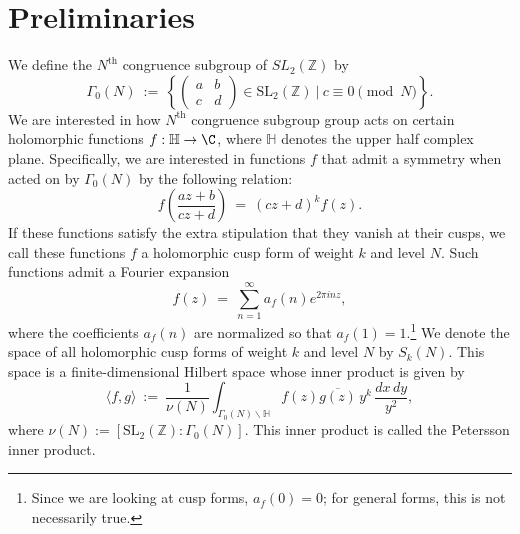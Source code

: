 \documentclass[11pt, reqno]{amsart}
\theoremstyle{definition}
\theoremstyle{remark}
\numberwithin{equation}{section}
\begin{document}
\vspace{1em}
\section{Preliminaries}
We define the $N^{\text{th}}$ congruence subgroup of $SL_2(\mathbb{Z})$ by
\begin{equation}\label{eq:cong-subgroup}
\Gamma_0(N) \ := \ \left\{ \begin{pmatrix} 
a & b \\ c & d 
\end{pmatrix} \in \mathrm{SL}_2(\mathbb{Z}) \ \Bigg| \ c \equiv 0 \pmod{N} \right\}.
\end{equation}
We are interested in how  $N^{\text{th}}$ congruence subgroup group acts on certain holomorphic functions $f: \mathbb{H}\to \C$, where $\mathbb{H}$ denotes the upper half complex plane. Specifically, we are interested in functions $f$ that admit a symmetry when acted on by $\Gamma_0(N)$ by the following relation:
\begin{equation}
f\left( \frac{az + b}{cz + d} \right)\ = \ (cz + d)^{k} f(z).
\end{equation}
If these functions satisfy the extra stipulation that they vanish at their cusps, we call these functions $f$ a holomorphic cusp form of weight $k$ and level $N$.
Such functions admit a Fourier expansion
\begin{equation}\label{eq:Fourier}
f(z)\ =\ \sum_{n=1}^{\infty}a_f(n)e^{2\pi inz},
\end{equation}
where the coefficients $a_f(n)$ are normalized so that $a_f(1)=1.$\footnote{Since we are looking at cusp forms, $a_f(0)=0$; for general forms, this is not necessarily true.}
We denote the space of all holomorphic cusp forms of weight $k$ and level $N$ by $S_k(N)$. This space is a finite-dimensional Hilbert space whose inner product is given by
\begin{equation}\label{eq:Petersson}
\langle f,g\rangle \ := \ \frac{1}{\nu(N)}\int_{\Gamma_0(N) \backslash\mathbb{H}}f(z)\overline{g(z)}\,y^k\,\frac{dx\,dy}{y^2},
\end{equation}
where $\nu(N):=[\mathrm{SL}_2(\mathbb{Z}):\Gamma_0(N)]$. This inner product is called the Petersson inner product. 
\end{document}
